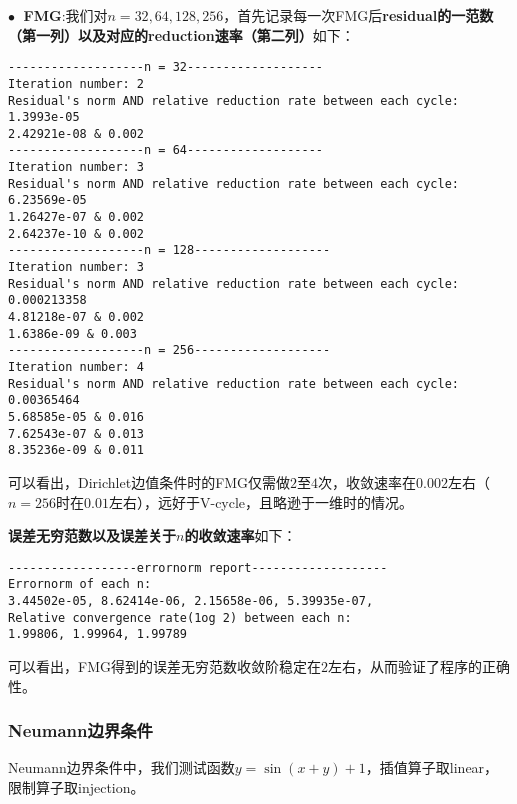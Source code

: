 \documentclass{ctexart}
\begin{document}
\begin{sloppypar}
$\bullet \;$ \textbf{FMG}:我们对$n=32,64,128,256$，首先记录每一次FMG后\textbf{residual的一范数（第一列）以及对应的reduction速率（第二列）}如下：
\begin{shaded}
\begin{verbatim}
-------------------n = 32-------------------
Iteration number: 2
Residual's norm AND relative reduction rate between each cycle: 
1.3993e-05
2.42921e-08 & 0.002
-------------------n = 64-------------------
Iteration number: 3
Residual's norm AND relative reduction rate between each cycle: 
6.23569e-05
1.26427e-07 & 0.002
2.64237e-10 & 0.002
-------------------n = 128-------------------
Iteration number: 3
Residual's norm AND relative reduction rate between each cycle: 
0.000213358
4.81218e-07 & 0.002
1.6386e-09 & 0.003
-------------------n = 256-------------------
Iteration number: 4
Residual's norm AND relative reduction rate between each cycle: 
0.00365464
5.68585e-05 & 0.016
7.62543e-07 & 0.013
8.35236e-09 & 0.011
\end{verbatim}
\end{shaded}
可以看出，Dirichlet边值条件时的FMG仅需做$2$至$4$次，收敛速率在$0.002$左右（$n=256$时在$0.01$左右），远好于V-cycle，且略逊于一维时的情况。

\textbf{误差无穷范数以及误差关于$n$的收敛速率}如下：
\begin{shaded}
\begin{verbatim}
------------------errornorm report-------------------
Errornorm of each n: 
3.44502e-05, 8.62414e-06, 2.15658e-06, 5.39935e-07,
Relative convergence rate(1og 2) between each n: 
1.99806, 1.99964, 1.99789
\end{verbatim} 
\end{shaded}
可以看出，FMG得到的误差无穷范数收敛阶稳定在$2$左右，从而验证了程序的正确性。

\subsubsection{Neumann边界条件}
Neumann边界条件中，我们测试函数$y=\sin (x+y)+1$，插值算子取linear，限制算子取injection。


\end{sloppypar}
\end{document}
